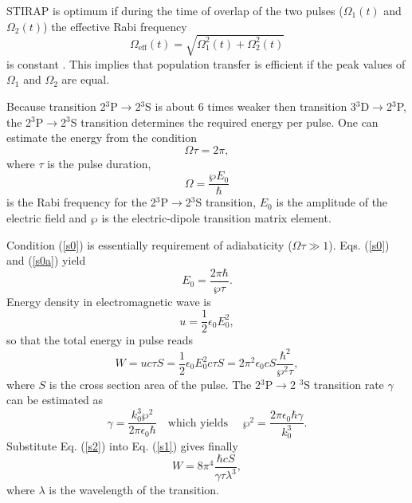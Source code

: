 STIRAP is optimum if during the time of overlap of the two pulses ($\Omega
_{1}(t)$ and $\Omega _{2}(t)$) the effective Rabi frequency
\begin{equation}
  \Omega _{\text{eff}}(t)=\sqrt{\Omega _{1}^{2}(t)+\Omega _{2}^{2}(t)}
\end{equation}%
is constant \cite{Berg98}. This implies that population transfer is
efficient if the peak values of $\Omega _{1}$ and $\Omega _{2}$ are equal.

Because transition 2$^{3}$P$\rightarrow $2$^{3}$S is about $6$ times weaker
then transition 3$^{3}$D$\rightarrow $2$^{3}$P, the 2$^{3}$P$\rightarrow $2$%
^{3}$S transition determines the required energy per pulse. One can estimate
the energy from the condition%
\begin{equation}
  \Omega \tau =2\pi ,  \label{s0}
\end{equation}%
where $\tau $ is the pulse duration,
\begin{equation}
  \Omega =\frac{\wp E_{0}}{\hbar }  \label{s0a}
\end{equation}%
is the Rabi frequency for the 2$^{3}$P$\rightarrow $2$^{3}$S transition, $%
E_{0}$ is the amplitude of the electric field and $\wp $ is the
electric-dipole transition matrix element.

Condition (\ref{s0}) is essentially requirement of adiabaticity ($\Omega
\tau \gg 1$). Eqs. (\ref{s0}) and (\ref{s0a}) yield%
\begin{equation}
  E_{0}=\frac{2\pi \hbar }{\wp \tau }.
\end{equation}%
Energy density in electromagnetic wave is
\begin{equation}
  u=\frac{1}{2}\epsilon _{0}E_{0}^{2},
\end{equation}%
so that the total energy in pulse reads%
\begin{equation}
  W=uc\tau S=\frac{1}{2}\epsilon _{0}E_{0}^{2}c\tau S=2\pi ^{2}\epsilon _{0}cS%
  \frac{\hbar ^{2}}{\wp ^{2}\tau },  \label{s1}
\end{equation}%
where $S$ is the cross section area of the pulse. The 2$^{3}$P$\rightarrow $2%
$^{3}$S transition rate $\gamma $ can be estimated as%
\begin{equation}
  \gamma =\frac{k_{0}^{3}\wp ^{2}}{2\pi \epsilon _{0}\hbar }\quad \text{which
    yields }\quad \wp ^{2}=\frac{2\pi \epsilon _{0}\hbar \gamma }{k_{0}^{3}}.
  \label{s2}
\end{equation}%
Substitute Eq. (\ref{s2}) into Eq. (\ref{s1}) gives finally%
\begin{equation}
  W=8\pi ^{4}\frac{\hbar cS}{\gamma \tau \lambda ^{3}},  \label{s3}
\end{equation}%
where $\lambda $ is the wavelength of the transition.

